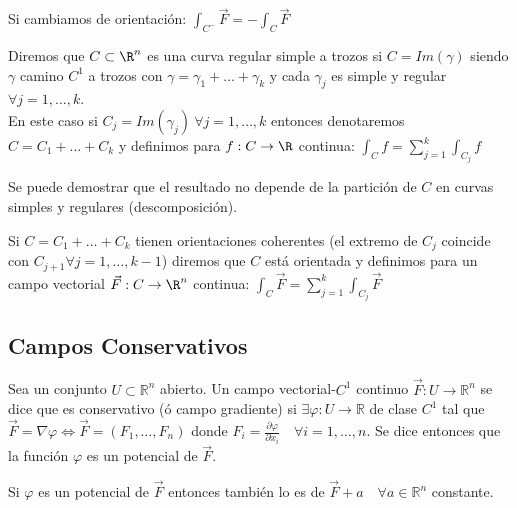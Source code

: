 \begin{observación}
Si cambiamos de orientación: $\int_{C^-} \vec{F} = -\int_{C} \vec{F}$
\end{observación}

\begin{definición} 
Diremos que $C \subset \R^n $ es una curva regular simple a trozos si $C = Im(\gamma)$ siendo $\gamma$ camino $C^1$ a trozos con $\gamma = \gamma_1 + \ldots + \gamma_k$ y cada $\gamma_j$ es simple y regular $\forall j = 1, \ldots, k$.\\
En este caso si $C_j = Im(\gamma_j) \ \forall j = 1, \ldots, k$ entonces denotaremos $C = C_1 + \ldots + C_k$ y definimos para $f: C \to \R$ continua: $\int_{C} f = \sum_{j=1}^{k} \int_{C_j} f$
\end{definición}

\begin{observación}
Se puede demostrar que el resultado no depende de la partición de $C$ en curvas simples y regulares (descomposición).
\end{observación}

\begin{observación}
Si $C = C_1 + \ldots + C_k$ tienen orientaciones coherentes (el extremo de $C_j$ coincide con $C_{j+1} \forall j = 1, \ldots, k-1$) diremos que $C$ está orientada y definimos para un campo vectorial $\vec{F}: C \to \R^n$ continua: $\int_{C} \vec{F} = \sum_{j=1}^{k} \int_{C_j} \vec{F}$
\end{observación}

\subsection{Campos Conservativos}

\begin{definición} 
Sea un conjunto $U  \subset \mathbb{R}^n$ abierto. Un campo vectorial-$C^1$ continuo $\vec{F}: U \to \mathbb{R}^n$ se dice que es conservativo (ó campo gradiente) si $\exists \varphi: U \to \mathbb{R}$ de clase $C^1$ tal que $\vec{F} = \nabla \varphi \iff \vec{F} = (F_1, \ldots, F_n)$ donde $F_i = \frac{\partial \varphi}{\partial x_i} \quad \forall i = 1, \ldots, n$.
Se dice entonces que la función $\varphi$ es un potencial de $\vec{F}$.
\end{definición}

\begin{observación}
Si $\varphi$ es un potencial de $\vec{F}$ entonces también lo es de $\vec{F} + a \quad \forall a \in \mathbb{R}^n$ constante.
\end{observación}

